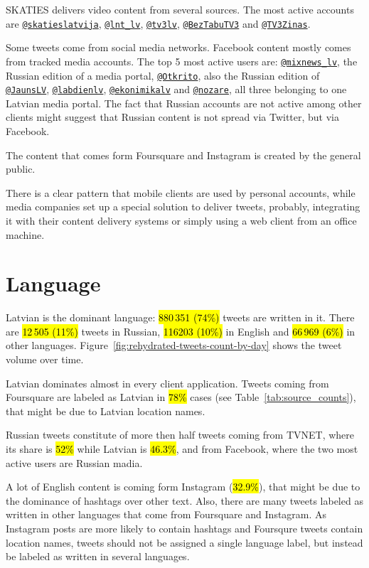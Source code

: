 \documentclass{IOS-Book-Article}
\makeatletter
\newcommand{\sn}[1]{\href{https://twitter.com/#1}{\texttt{@#1}}}
\makeatother
\begin{document}
SKATIES delivers video content from several sources. The most active accounts are \sn{skatieslatvija}, \sn{lnt\_lv}, \sn{tv3lv}, \sn{BezTabuTV3} and \sn{TV3Zinas}.

Some tweets come from social media networks. Facebook content mostly comes from tracked media accounts. The top 5 most active users are: \sn{mixnews\_lv}, the Russian edition of a media portal, \sn{Otkrito}, also the Russian edition of \sn{JaunsLV}, \sn{labdienlv}, \sn{ekonimikalv} and \sn{nozare}, all three belonging to one Latvian media portal. The fact that Russian accounts are not active among other clients might suggest that Russian content is not spread via Twitter, but via Facebook.

The content that comes form Foursquare and Instagram is created by the general public.

There is a clear pattern that mobile clients are used by personal accounts, while media companies set up a special solution to deliver tweets, probably, integrating it with their content delivery systems or simply using a web client from an office machine.

\section{Language}
\label{sec:language}

Latvian is the dominant language: \hl{880\,351 (74\%)} tweets are written in it.\footnotemark{} There are \hl{12\,505 (11\%)} tweets in Russian, \hl{116203 (10\%)} in English and \hl{66\,969 (6\%)} in other languages. Figure~\ref{fig:rehydrated-tweets-count-by-day} shows the tweet volume over time.


Latvian dominates almost in every client application. Tweets coming from Foursquare are labeled as Latvian in \hl{78\%} cases (see Table~\ref{tab:source_counts}), that might be due to Latvian location names.

Russian tweets constitute of more then half tweets coming from TVNET, where its share is \hl{52\%} while Latvian is \hl{46.3\%}, and from Facebook, where the two most active users are Russian madia.

A lot of English content is coming form Instagram (\hl{32.9\%}), that might be due to the dominance of hashtags over other text. Also, there are many tweets labeled as written in other languages that come from Foursquare and Instagram. As Instagram posts are more likely to contain hashtags and Foursqure tweets contain location names, tweets should not be assigned a single language label, but instead be labeled as written in several languages.
\end{document}
